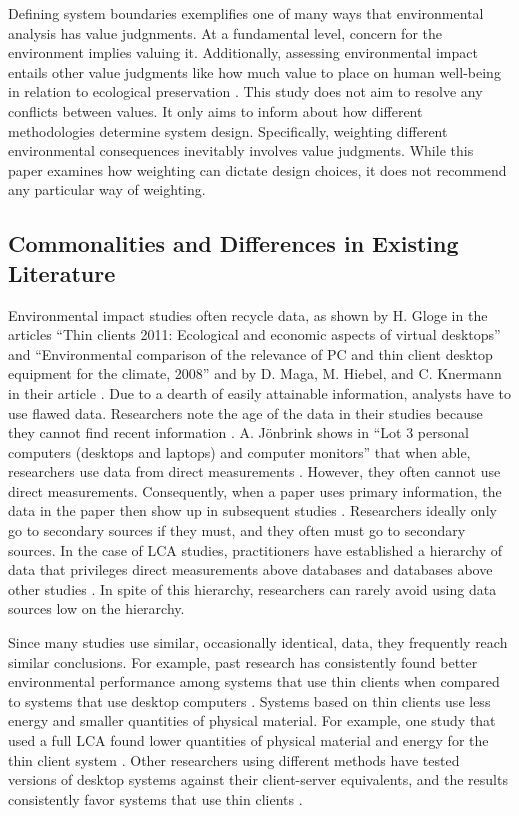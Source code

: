 \documentclass[final,journal,10pt,letterpaper,oneside,twocolumn,compsoc]%
{IEEEtran}
\begin{document}
Defining system boundaries exemplifies one of many ways that environmental
analysis has value judgnments. At a fundamental level, concern for the
environment
implies valuing it. Additionally, assessing environmental impact entails other
value
judgments like how much value to place on human well-being in relation to
ecological preservation \cite{pre}. This study does not aim to resolve any
conflicts
between values. It only aims to inform about how different methodologies
determine
system design. Specifically, weighting different environmental consequences
inevitably involves value judgments. While this paper examines
how weighting can dictate design choices, it does not recommend any particular
way of weighting.

\subsection{Commonalities and Differences in Existing Literature}
Environmental
impact studies often recycle data, as shown by H. Gloge in the articles ``Thin
clients 2011: Ecological and economic
aspects of virtual desktops'' and ``Environmental comparison of the relevance
of PC and thin client desktop equipment for the climate, 2008'' and by D. Maga,
M. Hiebel, and C. Knermann in their article \cite{client} \cite{desktop2}
\cite{maga}. Due to a dearth of easily attainable information, analysts have to
use flawed data. Researchers note the age of the data in
their studies because they cannot find recent information \cite{maga}
\cite{client}. A. J{\"o}nbrink shows in ``Lot 3 personal computers
(desktops
and laptops) and computer monitors'' that when able, researchers use data from
direct measurements
\cite{desktop}. However, they often cannot use direct measurements.
Consequently,
when a paper uses primary information, the data in the paper then show up
in subsequent studies \cite{maga} \cite{desktop2}. Researchers ideally only
go to secondary sources if they must, and they often must go to secondary
sources. In the case of LCA studies,
practitioners have established a
hierarchy of data that privileges direct measurements above databases and
databases above other studies \cite{textbook}. In spite of this hierarchy,
researchers can rarely avoid using data sources low on the hierarchy.

Since many studies use similar, occasionally identical, data, they
frequently reach similar conclusions. For example, past research has
consistently
found better environmental performance among systems that use thin clients when
compared to systems that use desktop computers \cite{maga} \cite{desktop2}.
Systems based on thin clients use less energy and smaller quantities of physical
material. For example, one study that used a full LCA found
lower quantities of physical material and energy for the thin client system
\cite{maga}.
Other researchers using different methods have tested versions of desktop
systems against
their client-server equivalents, and the results consistently favor
systems that use thin clients \cite{client}.
\end{document}

